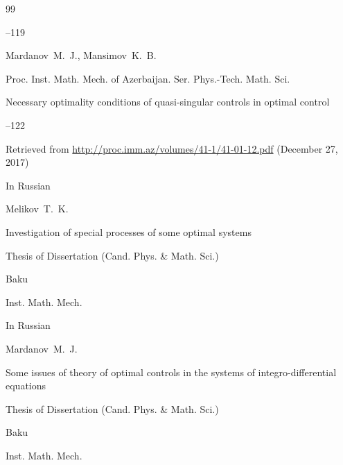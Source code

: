 \begin{thebibliography}{99}


--119




\by Mardanov~M.~J., Mansimov~K.~B. 

\jour Proc. Inst. Math. Mech. of Azerbaijan. Ser. Phys.-Tech. Math. Sci.

\paper Necessary optimality conditions of quasi-singular controls in optimal control




–122

\elink Retrieved from  \url{http://proc.imm.az/volumes/41-1/41-01-12.pdf} (December 27, 2017) 









\lang In Russian

\by Melikov~T.~K.

\thesis Investigation of special processes of some optimal systems

\thesisinfo Thesis of Dissertation (Cand. Phys. \& Math. Sci.)

\publaddr Baku

\publ Inst. Math.  Mech.










\lang In Russian

\by Mardanov~M.~J. 

\thesis Some issues of theory of optimal controls in the systems of integro-differential equations  

\thesisinfo Thesis of Dissertation (Cand. Phys. \& Math. Sci.)

\publaddr Baku

\publ Inst. Math.  Mech.







\end{thebibliography}
